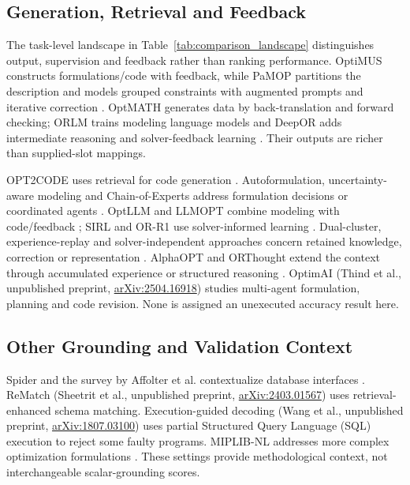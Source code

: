 \subsection{Generation, Retrieval and Feedback}
The task-level landscape in Table~\ref{tab:comparison_landscape} distinguishes output, supervision and feedback rather than ranking performance. OptiMUS constructs formulations/code with feedback, while PaMOP partitions the description and models grouped constraints with augmented prompts and iterative correction \cite{ahmaditeshnizi2024optimus_icml,pan2025pamop}. OptMATH generates data by back-translation and forward checking; ORLM trains modeling language models and DeepOR adds intermediate reasoning and solver-feedback learning \cite{lu2025optmath,huang2025orlm,xiao2026deepor}. Their outputs are richer than supplied-slot mappings.

OPT2CODE uses retrieval for code generation \cite{ahmed2025opt2code}. Autoformulation, uncertainty-aware modeling and Chain-of-Experts address formulation decisions or coordinated agents \cite{astorga2025autoformulation,yu2026uncertainty,xiao2024chainofexperts}. OptLLM and LLMOPT combine modeling with code/feedback \cite{zhang2024optllm,jiang2025llmopt}; SIRL and OR-R1 use solver-informed learning \cite{chen2025solver,ding2026orr1}. Dual-cluster, experience-replay and solver-independent approaches concern retained knowledge, correction or representation \cite{zhang2026dual,xie2026escaping,li2026solver}. AlphaOPT and ORThought extend the context through accumulated experience or structured reasoning \cite{kong2025alphaopt,yang2026orthought}. OptimAI (Thind et al., unpublished preprint, \href{https://arxiv.org/abs/2504.16918}{arXiv:2504.16918}) studies multi-agent formulation, planning and code revision. None is assigned an unexecuted accuracy result here.

\subsection{Other Grounding and Validation Context}
Spider and the survey by Affolter et al. contextualize database interfaces \cite{yu2018spider,affolter2019nli}. ReMatch (Sheetrit et al., unpublished preprint, \href{https://arxiv.org/abs/2403.01567}{arXiv:2403.01567}) uses retrieval-enhanced schema matching. Execution-guided decoding (Wang et al., unpublished preprint, \href{https://arxiv.org/abs/1807.03100}{arXiv:1807.03100}) uses partial Structured Query Language (SQL) execution to reject some faulty programs. MIPLIB-NL addresses more complex optimization formulations \cite{miplibnl2026}. These settings provide methodological context, not interchangeable scalar-grounding scores.

